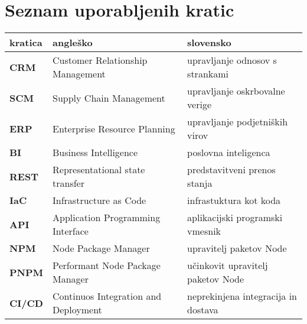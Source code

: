 \chapter*{Seznam uporabljenih kratic}

\begin{tabular}{l|l|l}
  {\bf kratica} & {\bf angleško} & {\bf slovensko} \\ \hline
  {\bf CRM} & Customer Relationship Management & upravljanje odnosov s strankami \\
  {\bf SCM} & Supply Chain Management & upravljanje oskrbovalne verige \\
  {\bf ERP} & Enterprise Resource Planning & upravljanje podjetniških virov \\
  {\bf BI} & Business Intelligence & poslovna inteligenca \\
  {\bf REST} & Representational state transfer & predstavitveni prenos stanja \\
  {\bf IaC} & Infrastructure as Code & infrastuktura kot koda \\
  {\bf API} & Application Programming Interface & aplikacijski programski vmesnik \\
  {\bf NPM} & Node Package Manager & upravitelj paketov Node \\
  {\bf PNPM} & Performant Node Package Manager & učinkovit upravitelj paketov Node \\
  {\bf CI/CD} & Continuos Integration and Deployment & neprekinjena integracija in  dostava \\
  
\end{tabular}